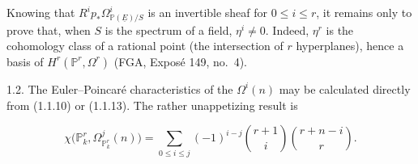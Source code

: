 Knowing that $R^ip_*\Omega^i_{\mathbb P(\underline E)/S}$ is an invertible
sheaf for $0\leq i\leq r$, it remains only to prove that, when $S$ is the
spectrum of a field, $\eta^i\ne0$.  Indeed, $\eta^r$ is the cohomology
class of a rational point (the intersection of $r$ hyperplanes), hence a
basis of $H^r(\mathbb P^r,\Omega^r)$ (FGA, Exposé 149, no.~4).

1.2. The Euler--Poincaré characteristics of the $\Omega^i(n)$ may be
calculated directly from (1.1.10) or (1.1.13).  The rather unappetizing
result is

\begin{equation*}
\chi\bigl(\mathbb P^r_k,\Omega^j_{\mathbb P^r_k}(n)\bigr)
=\sum_{0\leq i\leq j}(-1)^{i-j}
\binom{r+1}{i}\binom{r+n-i}{r}.
\end{equation*}

